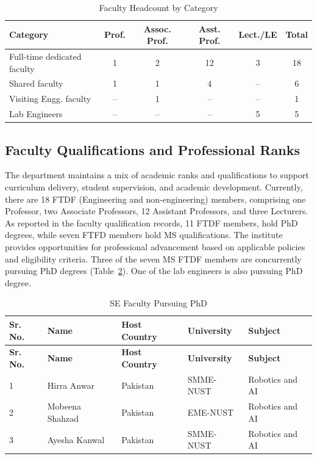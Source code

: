 \begin{table}[htbp]
\centering
\small
\setlength{\tabcolsep}{4pt}
\caption{Faculty Headcount by Category}
\label{tab:headcount1}
\begin{tabular}{@{}p{}ccccc@{}}
\toprule
\textbf{Category} & \textbf{Prof.} & \textbf{Assoc. Prof.} &
\textbf{Asst. Prof.} & \textbf{Lect./LE} & \textbf{Total} \\
\midrule
Full-time dedicated faculty & 1 & 2 & 12 & 3 & 18 \\
Shared faculty              & 1 & 1 & 4 & -- & 6 \\
Visiting Engg. faculty              & -- & 1 & -- & -- & 1 \\
Lab Engineers               & -- & -- & -- & 5 & 5 \\
\bottomrule
\end{tabular}
\end{table}

\subsection{Faculty Qualifications and Professional Ranks}
\label{pyramid-of-academic-structure}

The department maintains a mix of academic ranks and qualifications to support curriculum delivery, student supervision, and academic development. Currently, there are 18 FTDF (Engineering and non-engineering) members, comprising one Professor, two Associate Professors, 12 Assistant Professors, and three Lecturers. As reported in the faculty qualification records, 11 FTDF members, hold PhD degrees, while seven FTFD members hold MS qualifications. The institute provides opportunities for professional advancement based on applicable policies and eligibility criteria. Three of the seven MS FTDF members are concurrently pursuing PhD degrees (Table~\ref{tab:high}). One of the lab engineers is also pursuing PhD degree. 

\begin{longtable}{|>{\centering\arraybackslash}p{1cm}
|>{\raggedright\arraybackslash}p{2.8cm}
|>{\raggedright\arraybackslash}p{1.7cm}
|>{\raggedright\arraybackslash}p{2.5cm}
|>{\raggedright\arraybackslash}p{3cm}|}

\caption{SE Faculty Pursuing PhD}
\label{tab:high}\\
\hline
\textbf{Sr. No.} &
\textbf{Name} &
\textbf{Host Country} &
\textbf{University} &
\textbf{Subject} \\
\hline
\endfirsthead

\hline
\textbf{Sr. No.} &
\textbf{Name} &
\textbf{Host Country} &
\textbf{University} &
\textbf{Subject} \\
\hline
\endhead

1 & Hirra Anwar & Pakistan & SMME-NUST & Robotics and AI \\
\hline

2 & Mobeena Shahzad & Pakistan & EME-NUST & Robotics and AI \\
\hline

3 & Ayesha Kanwal & Pakistan & SMME-NUST & Robotics and AI \\
\hline

\end{longtable}

